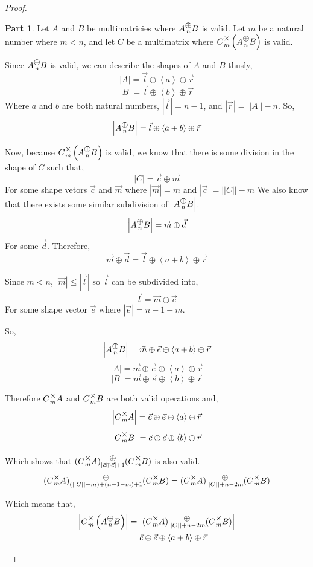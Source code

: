 \documentclass[12pt]{book}
\theoremstyle{plain}
\theoremstyle{definition}
\theoremstyle{ppart}
\newtheorem{ppart}{Part}
\theoremstyle{case}
\theoremstyle{solution}
\newcommand{\mmult}[1]{\text{\raisebox{1ex}{$\underset{#1}{\times}$}}}
\newcommand{\mconcat}[1]{\text{\raisebox{1ex}{$\underset{#1}{\oplus}$}}}
\newcommand{\shape}[1]{\left|#1\right|}
\begin{document}
\begin{proof}
\begin{ppart}
Let $A$ and $B$ be multimatricies where $A \mconcat{n} B$ is valid. 
Let $m$ be a natural number where $m < n$, and let $C$ be a multimatrix where
$C \mmult{m} \left(A \mconcat{n} B\right)$ is valid.

Since $A \mconcat{n} B$ is valid, we can describe the shapes of $A$ and $B$ thusly,
\[ \shape{A} = \vec{l} \oplus \left<a\right> \oplus \vec{r} \]
\[ \shape{B} = \vec{l} \oplus \left<b\right> \oplus \vec{r} \]
Where $a$ and $b$ are both natural numbers, $\shape{\vec{l}} = n-1$, and
$\shape{\vec{r}} = \shape{\shape{A}} - n$. So,
\[ \shape{A \mconcat{n} B} = \vec{l} \oplus \left<a+b\right> \oplus \vec{r} \]

Now, because $C \mmult{m} \left(A \mconcat{n} B\right)$ is valid, we know that
there is some division in the shape of $C$ such that,
\[ \shape{C} = \vec{c} \oplus \vec{m} \]
For some shape vetors $\vec{c}$ and $\vec{m}$ where $\shape{\vec{m}} = m$ and
$\shape{\vec{c}} = \shape{\shape{C}}-m$
We also know that there exists some similar subdivision of $\shape{A \mconcat{n} B}$.
\[ \shape{A \mconcat{n} B} = \vec{m} \oplus \vec{d} \]
For some $\vec{d}$. Therefore,
\[ \vec{m} \oplus \vec{d} = \vec{l} \oplus \left<a + b\right> \oplus \vec{r} \]

Since $m < n$, $\shape{\vec{m}} \le \shape{\vec{l}}$ so $\vec{l}$ can be subdivided
into,
\[ \vec{l} = \vec{m} \oplus \vec{e} \]
For some shape vector $\vec{e}$ where $\shape{\vec{e}} = n-1-m$.

So,
\[ \shape{A \mconcat{n} B} = \vec{m} \oplus \vec{e} \oplus \left<a+b\right> \oplus \vec{r} \]
\[ \shape{A} = \vec{m} \oplus \vec{e} \oplus \left<a\right> \oplus \vec{r} \]
\[ \shape{B} = \vec{m} \oplus \vec{e} \oplus \left<b\right> \oplus \vec{r} \]

Therefore $C \mmult{m} A$ and $C \mmult{m} B$ are both valid operations and,
\[ \shape{C \mmult{m} A} = \vec{c} \oplus \vec{e} \oplus \left<a\right> \oplus \vec{r} \]
\[ \shape{C \mmult{m} B} = \vec{c} \oplus \vec{e} \oplus \left<b\right> \oplus \vec{r} \]

Which shows that $(C \mmult{m} A) \mconcat{\shape{\vec{c} \oplus \vec{e}}+1} (C \mmult{m} B)$
is also valid.
\[
  (C \mmult{m} A) \mconcat{(\shape{\shape{C}}-m)+(n-1-m)+1} (C \mmult{m} B)
  = 
  (C \mmult{m} A) \mconcat{\shape{\shape{C}}+n-2m} (C \mmult{m} B)
\]

\begin{landscape}
Which means that,
\begin{align*}
  \shape{C \mmult{m} \left(A \mconcat{n} B\right)}
  &= \shape{(C \mmult{m} A) \mconcat{\shape{\shape{C}}+n-2m} (C \mmult{m} B)} \\
  &= \vec{c} \oplus \vec{e} \oplus \left<a+b\right> \oplus \vec{r}
\end{align*}


\end{landscape}
\end{ppart}
\end{proof}
\end{document}
